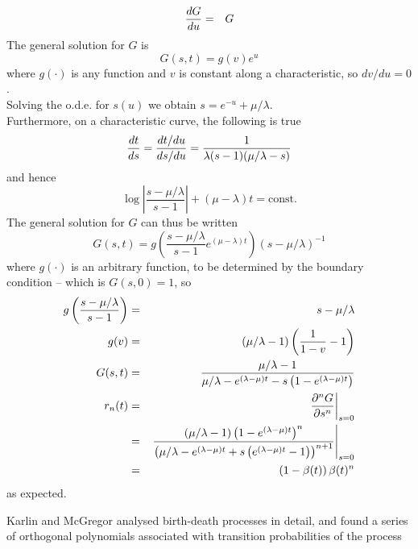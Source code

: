 \documentclass{beamer}
\begin{document}
\begin{frame}{}
\begin{eqnarray*}
\frac{d {G}}{d {u}} & = & G
\end{eqnarray*}
The general solution for $G$ is
\[
G(s,t) = g(v) e^u
\]
where $g(\cdot)$ is any function and $v$ is constant along a characteristic, so $dv/du=0$.
\\
Solving the o.d.e. for $s(u)$ we obtain
$s = e^{-u} + \mu / \lambda$.
\\
Furthermore, on a characteristic curve, the following is true
\[
\frac{d {t}}{d {s}} = \frac{dt/du}{ds/du} = \frac{1}{\lambda(s-1)(\mu/\lambda - s)}
\]
and hence
\[
\log \left| \frac{s - \mu / \lambda}{s - 1} \right| + (\mu - \lambda) t = \mbox{const.}
\]
The general solution for $G$ can thus be written
\[
G(s,t) = g \left( \frac{s - \mu / \lambda}{s - 1} e^{(\mu - \lambda) t} \right) (s - \mu / \lambda)^{-1}
\]
where $g(\cdot)$ is an arbitrary function, to be determined by the boundary condition -- which is $G(s,0)=1$, so
\begin{eqnarray*}
g \left( \frac{s - \mu / \lambda}{s - 1} \right) & = & s - \mu / \lambda \\
g(v) & = & (\mu / \lambda - 1) \left( \frac{1}{1 - v} - 1 \right) \\
G(s,t) & = & \frac{\mu / \lambda - 1}{\mu / \lambda - e^{(\lambda - \mu)t} - s \left( 1 - e^{(\lambda - \mu)t} \right)} \\
r_n(t) & = & \left. \frac{\partial^{n} {G}}{\partial {s}^{n}} \right|_{s=0} \\
& = & \left. \frac{(\mu / \lambda - 1) \left( 1 - e^{(\lambda - \mu)t} \right)^n}{\left( \mu / \lambda - e^{(\lambda - \mu)t} + s \left( e^{(\lambda - \mu)t} - 1 \right) \right)^{n+1}} \right|_{s=0} \\
& = & \left( 1 - \beta(t) \right) \beta(t)^n
\end{eqnarray*}
as expected.
   \iteme
  \iteme
 \item Karlin and McGregor analysed birth-death processes in detail,
and found a series of orthogonal polynomials associated with transition probabilities of the process
 \iteme
\end{frame}
\end{document}
